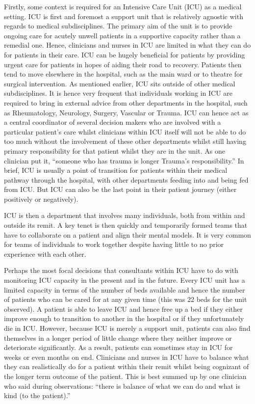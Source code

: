 \documentclass[a4paper, nobind]{templates/ociamthesis}
\begin{document}
Firstly, some context is required for an Intensive Care Unit (ICU) as a medical setting. ICU is first and foremost a support unit that is relatively agnostic with regards to medical subdisciplines. The primary aim of the unit is to provide ongoing care for acutely unwell patients in a supportive capacity rather than a remedial one. Hence, clinicians and nurses in ICU are limited in what they can do for patients in their care. ICU can be hugely beneficial for patients by providing urgent care for patients in hopes of aiding their road to recovery. Patients then tend to move elsewhere in the hospital, such as the main ward or to theatre for surgical intervention. As mentioned earlier, ICU sits outside of other medical subdisciplines. It is hence very frequent that individuals working in ICU are required to bring in external advice from other departments in the hospital, such as Rheumatology, Neurology, Surgery, Vascular or Trauma. ICU can hence act as a central coordinator of several decision makers who are involved with a particular patient's care whilst clinicians within ICU itself will not be able to do too much without the involvement of these other departments whilst still having primary responsibility for that patient whilst they are in the unit. As one clinician put it, ``someone who has trauma is longer Trauma's responsibility.'' In brief, ICU is usually a point of transition for patients within their medical pathway through the hospital, with other departments feeding into and being fed from ICU. But ICU can also be the last point in their patient journey (either positively or negatively).

ICU is then a department that involves many individuals, both from within and outside its remit. A key tenet is then quickly and temporarily formed teams that have to collaborate on a patient and align their mental models. It is very common for teams of individuals to work together despite having little to no prior experience with each other.

Perhaps the most focal decisions that consultants within ICU have to do with monitoring ICU capacity in the present and in the future. Every ICU unit has a limited capacity in terms of the number of beds available and hence the number of patients who can be cared for at any given time (this was 22 beds for the unit observed). A patient is able to leave ICU and hence free up a bed if they either improve enough to transition to another in the hospital or if they unfortunately die in ICU. However, because ICU is merely a support unit, patients can also find themselves in a longer period of little change where they neither improve or deteriorate significantly. As a result, patients can sometimes stay in ICU for weeks or even months on end. Clinicians and nurses in ICU have to balance what they can realistically do for a patient within their remit whilst being cognizant of the longer term outcome of the patient. This is best summed up by one clinician who said during observations: ``there is balance of what we can do and what is kind (to the patient).''
\end{document}
